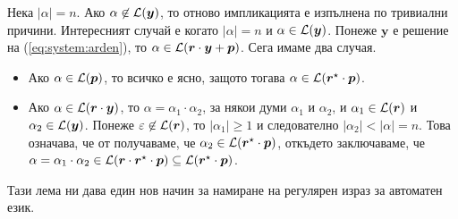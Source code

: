 \begin{hint}
\begin{itemize}
    Нека $|\alpha| = n$. Ако $\alpha \not\in \mathcal{L}(\bm{y})$, то отново импликацията е изпълнена по
    тривиални причини.
    Интересният случай е когато $|\alpha| = n$ и $\alpha \in \mathcal{L}(\bm{y})$.
    Понеже $\bm{y}$ е решение на (\ref{eq:system:arden}), то $\alpha \in \mathcal{L}(\bm{r} \cdot \bm{y} + \bm{p})$. Сега имаме два случая.
    \begin{itemize}
    \item
      Ако $\alpha \in \mathcal{L}(\bm{p})$, то всичко е ясно, защото тогава $\alpha \in \mathcal{L}(\bm{r}^\star \cdot \bm{p})$.
    \item
      Ако $\alpha\in\mathcal{L}(\bm{r}\cdot \bm{y})$, то $\alpha = \alpha_1 \cdot \alpha_2 $, за някои думи $\alpha_1$ и $\alpha_2$, и $\alpha_1 \in \mathcal{L}(\bm{r})$ и $\alpha_2 \in \mathcal{L}(\bm{y})$.
      Понеже $\varepsilon \not\in\mathcal{L}(\bm{r})$, то $|\alpha_1| \geq 1$ и следователно $|\alpha_2| < |\alpha| = n$. Това означава, че от \IndHyp получаваме, че $\alpha_2 \in \mathcal{L}(\bm{r}^\star\cdot \bm{p})$,
    откъдето заключаваме, че $\alpha = \alpha_1 \cdot \alpha_2 \in \mathcal{L}(\bm{r} \cdot \bm{r}^\star \cdot \bm{p}) \subseteq \mathcal{L}(\bm{r}^\star \cdot \bm{p})$.
    \end{itemize}
  \end{itemize}
\end{hint}

Тази лема ни дава един нов начин за намиране на регулярен израз за автоматен език.


